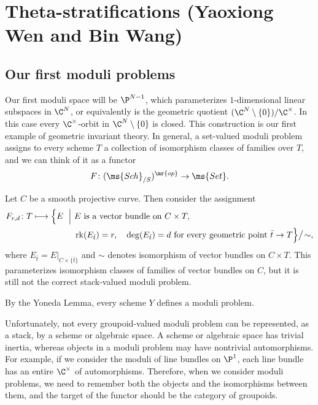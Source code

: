\section{Theta-stratifications (Yaoxiong Wen and Bin Wang)}%
\label{sec:Theta-stratifications}

\subsection{Our first moduli problems}%
\label{sub:Our first moduli problem}

Our first moduli space will be \(\P^{N-1}\), which parameterizes \(1\)-dimensional linear subspaces in \(\C^N\), or equivalently is the geometric quotient \((\C^N \setminus \{0\}) / \C^{\times}\). In this case every \(\C^{\times}\)-orbit in \(\C^N\setminus\{0\}\) is closed. This construction is our first example of geometric invariant theory. In general, a set-valued moduli problem assigns to every scheme \(T\) a collection of isomorphism classes of families over \(T\), and we can think of it as a functor
\[ F \colon (\ms{Sch}_{/S})^{\mr{op}} \to \ms{Set}. \]

\begin{exm}
    Let \(C\) be a smooth projective curve. Then consider the assignment
    \[
    \begin{aligned}
        F_{r,d}\colon T \longmapsto
        \Bigl\{
        E \ \Bigm|\ &
        E \text{ is a vector bundle on } C\times T,\\
        &\operatorname{rk}(E_{\bar t})=r,\quad \deg(E_{\bar t})=d
        \text{ for every geometric point } \bar t\to T
        \Bigr\}\big/\!\sim,
    \end{aligned}
    \]
    where \(E_{\bar t}=E|_{C\times\{\bar t\}}\) and \(\sim\) denotes isomorphism of vector bundles on \(C\times T\). This parameterizes isomorphism classes of families of vector bundles on \(C\), but it is still not the correct stack-valued moduli problem.
\end{exm}

\begin{exm}
    By the Yoneda Lemma, every scheme \(Y\) defines a moduli problem.
\end{exm}

Unfortunately, not every groupoid-valued moduli problem can be represented, as a stack, by a scheme or algebraic space. A scheme or algebraic space has trivial inertia, whereas objects in a moduli problem may have nontrivial automorphisms. For example, if we consider the moduli of line bundles on \(\P^1\), each line bundle has an entire \(\C^{\times}\) of automorphisms. Therefore, when we consider moduli problems, we need to remember both the objects and the isomorphisms between them, and the target of the functor should be the category of groupoids.

